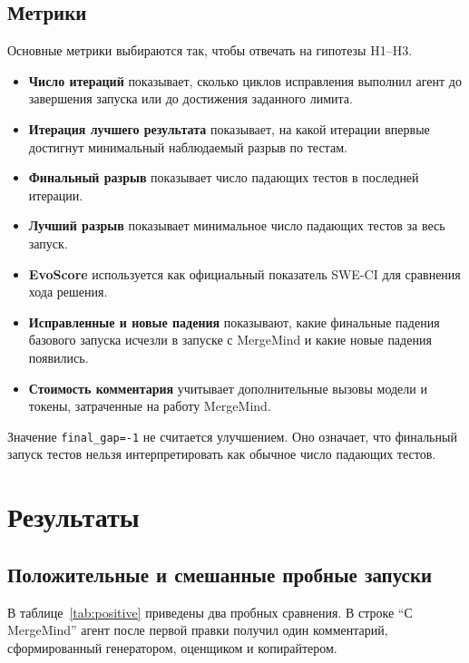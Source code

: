 \documentclass[12pt,a4paper]{article}
\begin{document}
\subsection{Метрики}

Основные метрики выбираются так, чтобы отвечать на гипотезы H1--H3.

\begin{itemize}
  \item \textbf{Число итераций} показывает, сколько циклов исправления выполнил
  агент до завершения запуска или до достижения заданного лимита.
  \item \textbf{Итерация лучшего результата} показывает, на какой итерации
  впервые достигнут минимальный наблюдаемый разрыв по тестам.
  \item \textbf{Финальный разрыв} показывает число падающих тестов в последней
  итерации.
  \item \textbf{Лучший разрыв} показывает минимальное число падающих тестов за
  весь запуск.
  \item \textbf{EvoScore} используется как официальный показатель SWE-CI для
  сравнения хода решения.
  \item \textbf{Исправленные и новые падения} показывают, какие финальные
  падения базового запуска исчезли в запуске с MergeMind и какие новые падения
  появились.
  \item \textbf{Стоимость комментария} учитывает дополнительные вызовы модели и
  токены, затраченные на работу MergeMind.
\end{itemize}

Значение \texttt{final\_gap=-1} не считается улучшением. Оно означает, что
финальный запуск тестов нельзя интерпретировать как обычное число падающих
тестов.

\section{Результаты}

\subsection{Положительные и смешанные пробные запуски}

В таблице~\ref{tab:positive} приведены два пробных сравнения. В строке
``С MergeMind'' агент после первой правки получил один комментарий,
сформированный генератором, оценщиком и копирайтером.
\end{document}
